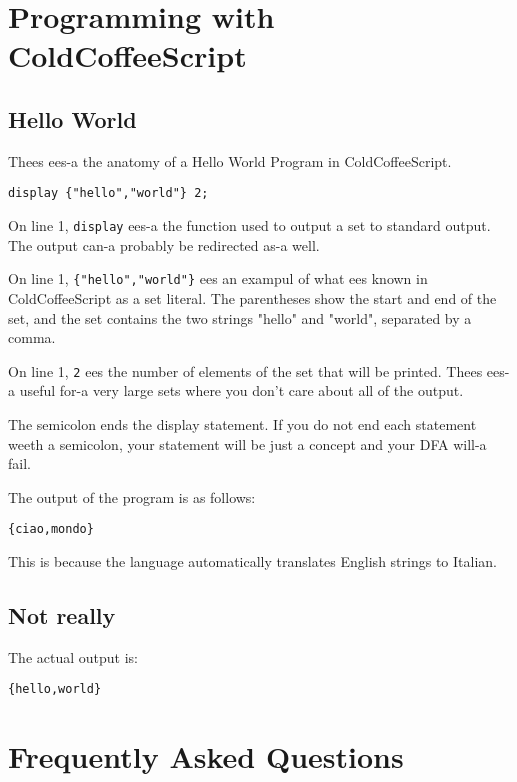 \documentclass{article}
\begin{document}
\section{Programming with ColdCoffeeScript}
\subsection{Hello World}
Thees ees-a the anatomy of a Hello World Program in ColdCoffeeScript.
\begin{lstlisting}
display {"hello","world"} 2;
\end{lstlisting}
On line 1, \lstinline|display| ees-a the function used to output a set to standard output. The output can-a probably be redirected as-a well.

On line 1, \lstinline|{"hello","world"}| ees an exampul of what ees known in ColdCoffeeScript as a set literal. The parentheses show the start and end of the set, and the set contains the two strings "hello" and "world", separated by a comma.

On line 1, \lstinline|2| ees the number of elements of the set that will be printed. Thees ees-a useful for-a very large sets where you don't care about all of the output.

The semicolon ends the display statement. If you do not end each statement weeth a semicolon, your statement will be just a concept and your DFA will-a fail.

The output of the program is as follows:
\begin{lstlisting}
{ciao,mondo}
\end{lstlisting}
This is because the language automatically translates English strings to Italian.
\newpage
\subsection{Not really}
The actual output is:
\begin{lstlisting}
{hello,world}
\end{lstlisting}
\section{Frequently Asked Questions}
\end{document}

